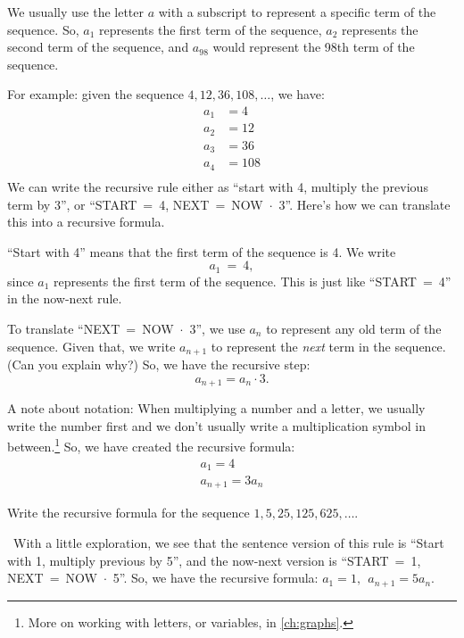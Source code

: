 We usually use the letter $a$ with a subscript to represent a specific term of the sequence. So, $a_1$ represents the first term of the sequence, $a_2$ represents the second term of the sequence, and $a_{98}$ would represent the 98th term of the sequence.

For example: given the sequence $4, 12, 36, 108, \dotsc$, we have: \[
\begin{aligned}
a_1 &= 4\\
a_2 &= 12\\
a_3 &= 36\\
a_4 &= 108\\
\end{aligned}\]
We can write the recursive rule either as ``start with 4, multiply the previous term by 3'', or ``START~=~4, NEXT~=~NOW~$\cdot$~3''. Here's how we can translate this into a recursive formula.

``Start with 4'' means that the first term of the sequence is 4. We write \[a_1~=~4,\] since $a_1$ represents the first term of the sequence. This is just like ``START~=~4'' in the now-next rule.

To translate ``NEXT~=~NOW~$\cdot$~3'', we use $a_n$ to represent any old term of the sequence. Given that, we write $a_{n+1}$ to represent the \textit{next} term in the sequence. (Can you explain why?) So, we have the recursive step: \[a_{n+1}=a_n\cdot3.\]

A note about notation: When multiplying a number and a letter, we usually write the number first and we don't usually write a multiplication symbol in between.\footnote{More on working with letters, or variables, in \cref{ch:graphs}.} So, we have created the recursive formula: \[\begin{array}{c}a_1=4 \\ a_{n+1}=3a_n\end{array}\]

\begin{boxex}
Write the recursive formula for the sequence $1, 5, 25, 125, 625, \dotsc$.

\exsoln\ With a little exploration, we see that the sentence version of this rule is ``Start with 1, multiply previous by 5'', and the now-next version is ``START~=~1, NEXT~=~NOW~$\cdot$~5''. So, we have the recursive formula: $a_1 = 1, ~~ a_{n+1}=5a_n$.
\end{boxex}
 
